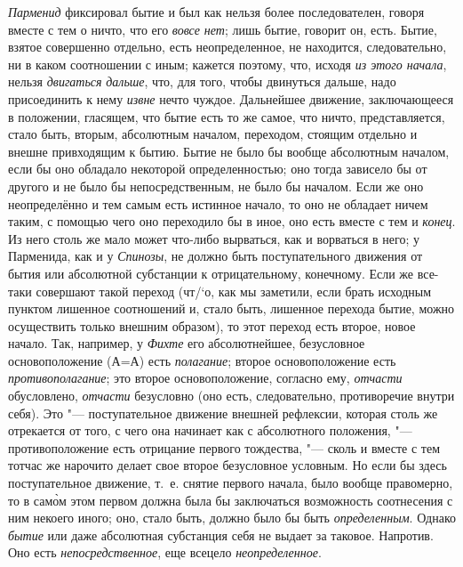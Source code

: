 {\em Парменид} фиксировал бытие и был как нельзя более
последователен, говоря вместе с тем о ничто, что его
{\em вовсе нет}; лишь бытие, говорит он, есть. Бытие,
взятое совершенно отдельно, есть неопределенное, не находится,
следовательно, ни в каком соотношении с иным; кажется поэтому, что,
исходя {\em из этого начала}, нельзя
{\em двигаться} {\em дальше}, что,
для того, чтобы двинуться дальше, надо присоединить к нему
{\em извне} нечто чуждое. Дальнейшее движение,
заключающееся в положении, гласящем, что бытие есть то же самое, что ничто,
представляется, стало быть, вторым, абсолютным началом, переходом, стоящим
отдельно и внешне привходящим к бытию. Бытие не было бы вообще абсолютным
началом, если бы оно обладало некоторой определенностью; оно тогда зависело
бы от другого и не было бы непосредственным, не было бы началом. Если же
оно неопределённо и тем самым есть истинное начало, то оно не обладает
ничем таким, с помощью чего оно переходило бы в иное, оно
есть вместе с тем и {\em конец}. Из него столь же мало
может что-либо вырваться, как и ворваться в него; у Парменида, как и у
{\em Спинозы}, не должно быть поступательного движения
от бытия или абсолютной субстанции к отрицательному, конечному. Если же
все-таки совершают такой переход (чт/`{о}, как мы заметили, если брать исходным
пунктом лишенное соотношений и, стало быть, лишенное перехода бытие, можно
осуществить только внешним образом), то этот переход есть второе, новое
начало. Так, например, у {\em Фихте} его абсолютнейшее,
безусловное основоположение (А=А) есть {\em полагание};
второе основоположение есть {\em противополагание}; это
второе основоположение, согласно ему, {\em отчасти}
обусловлено, {\em отчасти} безусловно (оно есть,
следовательно, противоречие внутри себя). Это "--- поступательное движение
внешней рефлексии, которая столь же отрекается от того, с чего она начинает
как с абсолютного положения, "--- противоположение есть отрицание первого
тождества, "--- сколь и вместе с тем тотчас же нарочито делает свое второе
безусловное условным. Но если бы здесь поступательное движение, т.~е.
снятие первого начала, было вообще правомерно, то в сам\`{о}м этом первом
должна была бы заключаться возможность соотнесения с ним некоего иного;
 оно, стало быть, должно было бы быть
{\em определенным}. Однако
{\em бытие} или даже абсолютная субстанция себя не
выдает за таковое. Напротив. Оно есть
{\em непосредственное}, еще всецело
{\em неопределенное}.

